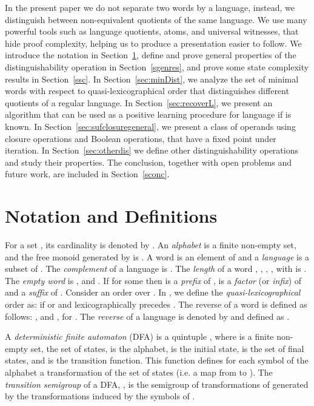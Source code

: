 \documentclass{article}
\newcommand{\dfa}{DFA\xspace}
\begin{document}
In the present paper we do not separate two words by a language,
instead, we distinguish between non-equivalent quotients of the same
language. We use many powerful tools such as 
language quotients, atoms, and universal witnesses, 
that hide proof complexity,
helping us to produce a presentation easier to follow.
We introduce the notation in Section~\ref{snotation},  define and
prove general properties of the distinguishability operation in
Section~\ref{sgenres}, and prove some state complexity results in
Section~\ref{ssc}.  
In Section~\ref{sec:minDist}, we analyze the set of minimal words with
respect to quasi-lexicographical order that distinguishes different
quotients of a regular language. 
In Section~\ref{sec:recoverL}, we present an algorithm that can be used
as a positive learning procedure for language  if  is known.
In Section~\ref{sec:sufclosuregeneral}, we present a class of operands using closure operations and Boolean operations, that have a 
fixed point under iteration. 
In Section~\ref{sec:otherdis} we define other distinguishability operations and study their properties.  
The conclusion, together with open problems and future work, are included 
in Section~\ref{sconc}. 


\section{Notation and Definitions}
\label{snotation}
For a set , its cardinality is denoted by . 
An \emph{alphabet}  is a finite non-empty set, and the free monoid
generated by  is . 
A word  is an element of  and a \emph{language} is a subset of .  
The \emph{complement} of a language  is .
The \emph{length} of a word , ,
, , with  is .  
The \emph{empty word} is , and . If  for some  then  is a \emph{prefix} of ,  is a \emph{factor} (or \emph{infix}) of  and  a \emph{suffix} of .
Consider an order over . 
In , we define the \emph{quasi-lexicographical} order as: 
if  or  and  lexicographically precedes . 
The reverse  of a
word  is defined as follows: , and , for . 
The \emph{reverse} of a language  is denoted by  and defined as .

A \emph{deterministic finite automaton} (\dfa) is a quintuple
, where  is  a finite
non-empty set, the set of states,  is the  alphabet,  is the initial state,  is the set of final states,
and  is the transition
function. This function defines for each symbol of
the alphabet a transformation of the set  of states (i.e. a map from  to ). The
\emph{transition semigroup} of a \dfa , 
\cite{bell14:_symmet_group_and_quotien_compl},
 is the semigroup of transformations of  generated 
by the transformations induced by the symbols of .
\end{document}
